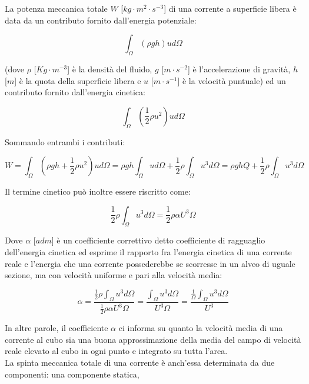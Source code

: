 \documentclass[12pt]{article} %
\begin{document}
\noindent La potenza meccanica totale $W$ [$kg\cdot m^2\cdot s^{-3}$] di una corrente a superficie libera è data da un contributo fornito dall’energia potenziale:

\begin{equation}
   \int_{\Omega}^{}(\rho gh)ud\Omega
   \label{eqn:W_energia_potenziale}
\end{equation}

\noindent (dove $\rho$ [$Kg \cdot m^{-3}$] è la densità del fluido, $g$ [$m\cdot s^{-2}$] è l'accelerazione di gravità, $h$ [$m$] è la quota della superficie libera e $u$ [$m\cdot s^{-1}$] è la velocità puntuale) ed un contributo fornito dall’energia cinetica:

\begin{equation}
   \int_{\Omega}^{}\left(\frac{1}{2}\rho u^{2}\right)ud\Omega
   \label{eqn:W_energia_cinetica}
\end{equation}

\noindent Sommando entrambi i contributi:  

\begin{equation}
   W=\int_{\Omega}^{}(\rho gh+\frac{1}{2}\rho u^{2})ud\Omega=\rho gh\int_{\Omega}^{} ud\Omega + \frac{1}{2}\rho \int_{\Omega}^{} u^{3}d\Omega=\rho ghQ + \frac{1}{2}\rho \int_{\Omega}^{} u^{3}d\Omega
   \label{eqn:W}
\end{equation}

\noindent Il termine cinetico può inoltre essere riscritto come:

\begin{equation}
   \frac{1}{2}\rho \int_{\Omega}^{} u^{3}d\Omega=\frac{1}{2}\rho \alpha U^{3}\Omega
   \label{eqn:energia_cinetica_alfa}
\end{equation}

\noindent Dove $\alpha$ [$adm$] è un coefficiente correttivo detto coefficiente di ragguaglio dell’energia cinetica ed esprime il rapporto fra l’energia cinetica di una corrente reale e l’energia che una corrente possederebbe se scorresse in un alveo di uguale sezione, ma con velocità uniforme e pari alla velocità media:

\begin{equation}
   \alpha=\frac{\frac{1}{2}\rho \int_{\Omega}^{} u^{3}d\Omega}{\frac{1}{2}\rho \alpha U^{3}\Omega}=\frac{\int_{\Omega}^{} u^{3}d\Omega}{U^{3}\Omega}=\frac{\frac{1}{\Omega}\int_{\Omega}^{} u^{3}d\Omega}{U^{3}}
   \label{eqn:alfa}
\end{equation}

\noindent In altre parole, il coefficiente $\alpha$ ci informa su quanto la velocità media di una corrente al cubo sia una buona approssimazione della media del campo di velocità reale elevato al cubo in ogni punto e integrato su tutta l’area.\\
La spinta meccanica totale di una corrente è anch’essa determinata da due componenti: una componente statica,
\end{document}
